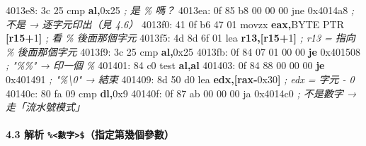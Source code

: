 \documentclass[10pt,a4paper]{article}
\newenvironment{Shaded}{\begin{snugshade}}{\end{snugshade}}
\newcommand{\BaseNTok}[1]{\textcolor[rgb]{0.00,0.00,0.81}{#1}}
\newcommand{\BuiltInTok}[1]{#1}
\newcommand{\CommentTok}[1]{\textcolor[rgb]{0.56,0.35,0.01}{\textit{#1}}}
\newcommand{\ControlFlowTok}[1]{\textcolor[rgb]{0.13,0.29,0.53}{\textbf{#1}}}
\newcommand{\DataTypeTok}[1]{\textcolor[rgb]{0.13,0.29,0.53}{#1}}
\newcommand{\DecValTok}[1]{\textcolor[rgb]{0.00,0.00,0.81}{#1}}
\newcommand{\KeywordTok}[1]{\textcolor[rgb]{0.13,0.29,0.53}{\textbf{#1}}}
\newcommand{\NormalTok}[1]{#1}
\newcommand{\OperatorTok}[1]{\textcolor[rgb]{0.81,0.36,0.00}{\textbf{#1}}}
\renewenvironment{Shaded}{%
  \def\FrameCommand{\fboxsep=3.2pt\colorbox{shadecolor}}%
  \MakeFramed{\advance\hsize-\width\FrameRestore\small}%
}{%
  \endMakeFramed
}
\begin{document}
\begin{Shaded}
\begin{Highlighting}[]
\NormalTok{  4013e8: 3c 25              }\BuiltInTok{cmp}  \KeywordTok{al}\OperatorTok{,}\BaseNTok{0x25}       \CommentTok{; 是 \textquotesingle{}\%\textquotesingle{} 嗎？}
\NormalTok{  4013ea: 0f 85 b8 }\DecValTok{00} \DecValTok{00} \DecValTok{00}\NormalTok{  jne  }\BaseNTok{0x4014a8}       \CommentTok{; 不是 → 逐字元印出（見 4.6）}
\NormalTok{  4013f0: 41 0f b6 }\DecValTok{47} \DecValTok{01}\NormalTok{     movzx }\KeywordTok{eax}\OperatorTok{,}\DataTypeTok{BYTE} \DataTypeTok{PTR} \OperatorTok{[}\KeywordTok{r15}\OperatorTok{+}\DecValTok{1}\OperatorTok{]}  \CommentTok{; 看 \textquotesingle{}\%\textquotesingle{} 後面那個字元}
\NormalTok{  4013f5: 4d 8d 6f 01        }\BuiltInTok{lea}  \KeywordTok{r13}\OperatorTok{,[}\KeywordTok{r15}\OperatorTok{+}\DecValTok{1}\OperatorTok{]}            \CommentTok{; r13 = 指向 \textquotesingle{}\%\textquotesingle{} 後面那個字元}
\NormalTok{  4013f9: 3c 25              }\BuiltInTok{cmp}  \KeywordTok{al}\OperatorTok{,}\BaseNTok{0x25}
\NormalTok{  4013fb: 0f 84 07 01 00 00  }\ControlFlowTok{je}   \BaseNTok{0x401508}       \CommentTok{; "\%\%" → 印一個 \textquotesingle{}\%\textquotesingle{}}
\NormalTok{  401401: 84 c0              test }\KeywordTok{al}\OperatorTok{,}\KeywordTok{al}
\NormalTok{  401403: 0f 84 88 00 00 00  }\ControlFlowTok{je}   \BaseNTok{0x401491}       \CommentTok{; "\%\textbackslash{}0" → 結束}
\NormalTok{  401409: 8d 50 d0           lea  }\KeywordTok{edx}\OperatorTok{,[}\KeywordTok{rax}\OperatorTok{{-}}\BaseNTok{0x30}\OperatorTok{]}  \CommentTok{; edx = 字元 {-} \textquotesingle{}0\textquotesingle{}}
\NormalTok{  40140c: 80 fa }\DecValTok{09}\NormalTok{           cmp  }\KeywordTok{dl}\OperatorTok{,}\BaseNTok{0x9}
\NormalTok{  40140f: 0f 87 ab }\DecValTok{00} \DecValTok{00} \DecValTok{00}\NormalTok{  ja   }\BaseNTok{0x4014c0}       \CommentTok{; 不是數字 → 走「流水號模式」}
\end{Highlighting}
\end{Shaded}

\paragraph{\texorpdfstring{4.3 解析
\texttt{\%\allowbreak{}\textless{}\allowbreak{}數字\textgreater{}\allowbreak{}\$\allowbreak{}}（指定第幾個參數）}{4.3 解析 \%\textless 數字\textgreater\$（指定第幾個參數）}}\label{ux89e3ux6790-ux6578ux5b57ux6307ux5b9aux7b2cux5e7eux500bux53c3ux6578}
\end{document}
